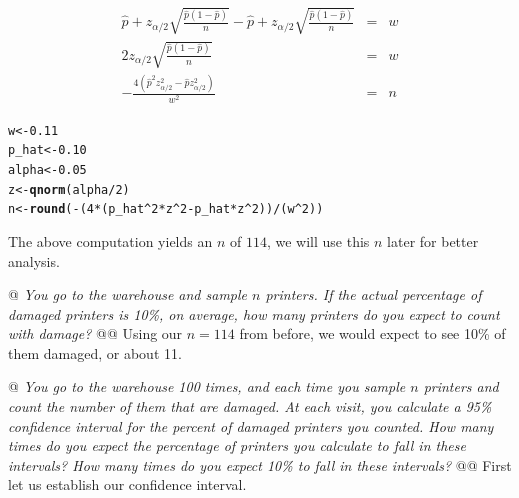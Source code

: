 \documentclass[10pt]{report}\usepackage[]{graphicx}\usepackage[]{xcolor}
\makeatletter
\newcommand{\hlnum}[1]{\textcolor[rgb]{0.686,0.059,0.569}{#1}}%
\newcommand{\hlopt}[1]{\textcolor[rgb]{0,0,0}{#1}}%
\newcommand{\hlstd}[1]{\textcolor[rgb]{0.345,0.345,0.345}{#1}}%
\newcommand{\hlkwb}[1]{\textcolor[rgb]{0.69,0.353,0.396}{#1}}%
\newcommand{\hlkwd}[1]{\textcolor[rgb]{0.737,0.353,0.396}{\textbf{#1}}}%
\newenvironment{kframe}{%
 \def\at@end@of@kframe{}%
 \ifinner\ifhmode%
  \def\at@end@of@kframe{\end{minipage}}%
  \begin{minipage}{\columnwidth}%
 \fi\fi%
 \def\FrameCommand##1{\hskip\@totalleftmargin \hskip-\fboxsep
 \colorbox{shadecolor}{##1}\hskip-\fboxsep
     \hskip-\linewidth \hskip-\@totalleftmargin \hskip\columnwidth}%
 \MakeFramed {\advance\hsize-\width
   \@totalleftmargin\z@ \linewidth\hsize
   \@setminipage}}%
 {\par\unskip\endMakeFramed%
 \at@end@of@kframe}
\newenvironment{knitrout}{}{} %
\makeatother
\begin{document}
\begin{easylist}[enumerate]
        \[
            \begin{aligned}
                \hat{p} + z_{\alpha/2} \sqrt{\frac{\hat{p} (1 - \hat{p})}{n} } -
                    \hat{p} + z_{\alpha/2} \sqrt{\frac{\hat{p} (1 - \hat{p})}{n} } &=& w\\
                2 z_{\alpha/2} \sqrt{\frac{\hat{p} (1 - \hat{p})}{n} } &=& w\\
                -\frac{4 \left(\hat{p}^2 z_{\alpha / 2}^2-\hat{p} z_{\alpha / 2}^2\right)}{w^2} &=& n
            \end{aligned}
        \]

\begin{knitrout}
\color{fgcolor}\begin{kframe}
\begin{alltt}
         \hlstd{w}     \hlkwb{<-} \hlnum{0.11}
         \hlstd{p_hat} \hlkwb{<-} \hlnum{0.10}
         \hlstd{alpha} \hlkwb{<-} \hlnum{0.05}
         \hlstd{z}     \hlkwb{<-} \hlkwd{qnorm}\hlstd{(alpha} \hlopt{/} \hlnum{2}\hlstd{)}
         \hlstd{n}     \hlkwb{<-} \hlkwd{round}\hlstd{(}\hlopt{-} \hlstd{(}\hlnum{4} \hlopt{*} \hlstd{(p_hat}\hlopt{^}\hlnum{2} \hlopt{*} \hlstd{z}\hlopt{^}\hlnum{2} \hlopt{-} \hlstd{p_hat} \hlopt{*} \hlstd{z}\hlopt{^}\hlnum{2}\hlstd{))}\hlopt{/}\hlstd{(w}\hlopt{^}\hlnum{2}\hlstd{))}
\end{alltt}
\end{kframe}
\end{knitrout}

        The above computation yields an $n$ of $\boxed{114 }$, we will use this $n$ later for better analysis.

        @ \textit{You go to the warehouse and sample $n$ printers. If the actual percentage of damaged printers is 10\%,
        on average, how many printers do you expect to count with damage?}
        @@ Using our $n=114$ from before, we would expect to see 10\% of them damaged, or about 11.

        @ \textit{You go to the warehouse 100 times, and each time you sample $n$ printers and count the number of them
        that are damaged. At each visit, you calculate a 95\% confidence interval for the percent of damaged printers
        you counted.  How many times do you expect the percentage of printers you calculate to fall in these intervals?
        How many times do you expect 10\% to fall in these intervals?}\newline
        @@ First let us establish our confidence interval.


\end{easylist}
\end{document}
